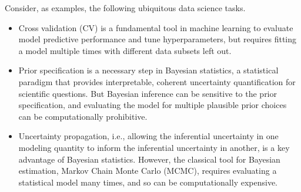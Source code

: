 Consider, as examples, the following ubiquitous data science tasks.
%
\begin{itemize}
%
        \item Cross validation (CV) is a fundamental tool in machine learning to
        evaluate model predictive performance and tune hyperparameters, but
        requires fitting a model multiple times with different data subsets left
        out.
        \item  Prior specification is a necessary step in Bayesian statistics, a
        statistical paradigm that provides interpretable, coherent uncertainty
        quantification for scientific questions.  But Bayesian inference can be
        sensitive to the prior specification, and evaluating the model for
        multiple plausible prior choices can be computationally prohibitive.
        \item Uncertainty propagation, i.e., allowing the inferential
        uncertainty in one modeling quantity to inform the inferential
        uncertainty in another, is a key advantage of Bayesian statistics.
        However, the classical tool for Bayesian estimation, Markov Chain Monte
        Carlo (MCMC), requires evaluating a statistical model many times, and so
        can be computationally expensive.
%
\end{itemize}
%


